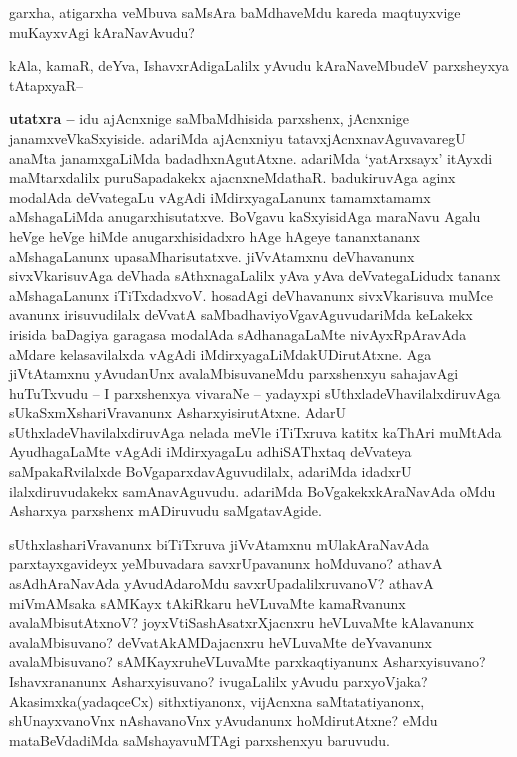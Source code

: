 
\begin{artha}
garxha, atigarxha veMbuva saMsAra baMdhaveMdu kareda maqtuyxvige muKayxvAgi kAraNavAvudu?

kAla, kamaR, deYva, IshavxrAdigaLalilx yAvudu kAraNaveMbudeV parxsheyxya tAtapxyaR--

\textbf{utatxra --} idu ajAcnxnige saMbaMdhisida parxshenx, jAcnxnige janamxveVkaSxyiside. adariMda ajAcnxniyu tatavxjAcnxnavAguvavaregU  anaMta janamxgaLiMda badadhxnAgutAtxne. adariMda `yatArxsayx' itAyxdi maMtarxdalilx puruSapadakekx ajacnxneMdathaR. badukiruvAga aginx modalAda deVvategaLu vAgAdi iMdirxyagaLanunx tamamxtamamx aMshagaLiMda anugarxhisutatxve. BoVgavu kaSxyisidAga maraNavu Agalu heVge heVge hiMde  anugarxhisidadxro hAge hAgeye tananxtananx aMshagaLanunx upasaMharisutatxve. jiVvAtamxnu deVhavanunx sivxVkarisuvAga deVhada sAthxnagaLalilx yAva yAva deVvategaLidudx tananx aMshagaLanunx iTiTxdadxvoV. hosadAgi deVhavanunx sivxVkarisuva muMce avanunx irisuvudilalx deVvatA saMbadhaviyoVgavAguvudariMda keLakekx irisida baDagiya garagasa modalAda sAdhanagaLaMte nivAyxRpAravAda aMdare kelasavilalxda vAgAdi iMdirxyagaLiMdakUDirutAtxne. Aga jiVtAtamxnu yAvudanUnx avalaMbisuvaneMdu parxshenxyu sahajavAgi huTuTxvudu -- I parxshenxya vivaraNe -- yadayxpi sUthxladeVhavilalxdiruvAga sUkaSxmXshariVravanunx AsharxyisirutAtxne. AdarU sUthxladeVhavilalxdiruvAga nelada meVle iTiTxruva katitx kaThAri muMtAda AyudhagaLaMte vAgAdi iMdirxyagaLu adhiSAThxtaq deVvateya saMpakaRvilalxde BoVgaparxdavAguvudilalx, adariMda idadxrU ilalxdiruvudakekx samAnavAguvudu. adariMda BoVgakekxkAraNavAda oMdu Asharxya parxshenx mADiruvudu saMgatavAgide.

sUthxlashariVravanunx biTiTxruva jiVvAtamxnu mUlakAraNavAda parxtayxgavideyx yeMbuvadara savxrUpavanunx hoMduvano? athavA asAdhAraNavAda yAvudAdaroMdu savxrUpadalilxruvanoV? athavA miVmAMsaka sAMKayx tAkiRkaru heVLuvaMte kamaRvanunx avalaMbisutAtxnoV? joyxVtiSashAsatxrXjacnxru heVLuvaMte kAlavanunx avalaMbisuvano? deVvatAkAMDajacnxru heVLuvaMte deYvavanunx avalaMbisuvano? sAMKayxruheVLuvaMte parxkaqtiyanunx Asharxyisuvano? Ishavxrananunx Asharxyisuvano? ivugaLalilx yAvudu parxyoVjaka? Akasimxka(yadaqceCx) sithxtiyanonx, vijAcnxna saMtatatiyanonx, shUnayxvanoVnx nAshavanoVnx yAvudanunx hoMdirutAtxne? eMdu mataBeVdadiMda saMshayavuMTAgi parxshenxyu baruvudu.


\end{artha}
